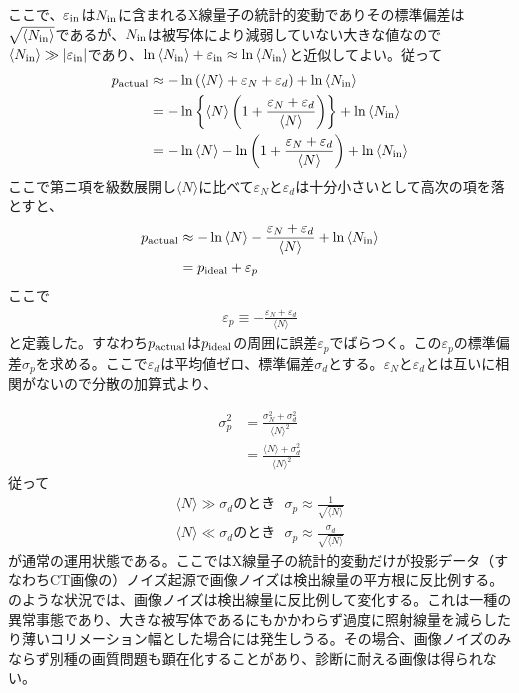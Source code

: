 ここで、$\varepsilon_{\rm in}$は$N_{\rm in}$に含まれるX線量子の統計的変動でありその標準偏差は$\sqrt{\langle N_{\rm in} \rangle}$であるが、$N_{\rm in}$は被写体により減弱していない大きな値なので$\langle N_{\rm in} \rangle\gg|\varepsilon_{\rm in}|$であり、$\ln{\langle N_{\rm in} \rangle + \varepsilon_{\rm in}}\approx\ln{\langle N_{\rm in} \rangle}$と近似してよい。従って
\begin{align}
p_{\rm actual}&\approx-\ln{(\langle N \rangle + \varepsilon_N + \varepsilon_d)}+\ln{\langle N_{\rm in} \rangle}\\
&=-\ln\left\{\langle N \rangle\left(1+\frac{\varepsilon_N+\varepsilon_d}{\langle N \rangle} \right)\right\}+\ln{\langle N_{\rm in} \rangle}\\
&=-\ln{\langle N \rangle}-\ln\left(1+\frac{\varepsilon_N+\varepsilon_d}{\langle N \rangle} \right)+\ln{\langle N_{\rm in} \rangle}\\
\end{align}
ここで第ニ項を級数展開し$\langle N \rangle$に比べて$\varepsilon_N$と$\varepsilon_d$は十分小さいとして高次の項を落とすと、
\begin{align}
p_{\rm actual}&\approx-\ln{\langle N \rangle}-\frac{\varepsilon_N+\varepsilon_d}{\langle N \rangle}+\ln{\langle N_{\rm in} \rangle}\\
&=p_{\rm ideal} + \varepsilon_p
\end{align}
ここで
\begin{align}
\varepsilon_p\equiv-\frac{\varepsilon_N+\varepsilon_d}{\langle N \rangle}
\end{align}
と定義した。すなわち$p_{\rm actual}$は$p_{\rm ideal}$の周囲に誤差$\varepsilon_p$でばらつく。この$\varepsilon_p$の標準偏差$\sigma_p$を求める。ここで$\varepsilon_d$は平均値ゼロ、標準偏差$\sigma_d$とする。$\varepsilon_N$と$\varepsilon_d$とは互いに相関がないので分散の加算式より、

\begin{align}
\sigma^2_p&=\frac{\sigma^2_N+\sigma^2_d}{\langle N \rangle^2}\\
&=\frac{\langle N \rangle + \sigma^2_d}{\langle N \rangle^2}
\end{align}
従って
\begin{align}
\langle N \rangle\gg\sigma_dのとき\ \ \ \sigma_p\approx\frac{1}{\sqrt{\langle N \rangle}}\label{eq:normal}\\
\langle N \rangle\ll\sigma_dのとき\ \ \ \sigma_p\approx\frac{\sigma_d}{\sqrt{\langle N \rangle}}\label{eq:ijou}
\end{align}
が通常の運用状態である。ここではX線量子の統計的変動だけが投影データ（すなわちCT画像の）ノイズ起源で画像ノイズは検出線量の平方根に反比例する。\\
のような状況では、画像ノイズは検出線量に反比例して変化する。これは一種の異常事態であり、大きな被写体であるにもかかわらず過度に照射線量を減らしたり薄いコリメーション幅とした場合には発生しうる。その場合、画像ノイズのみならず別種の画質問題も顕在化することがあり、診断に耐える画像は得られない。

